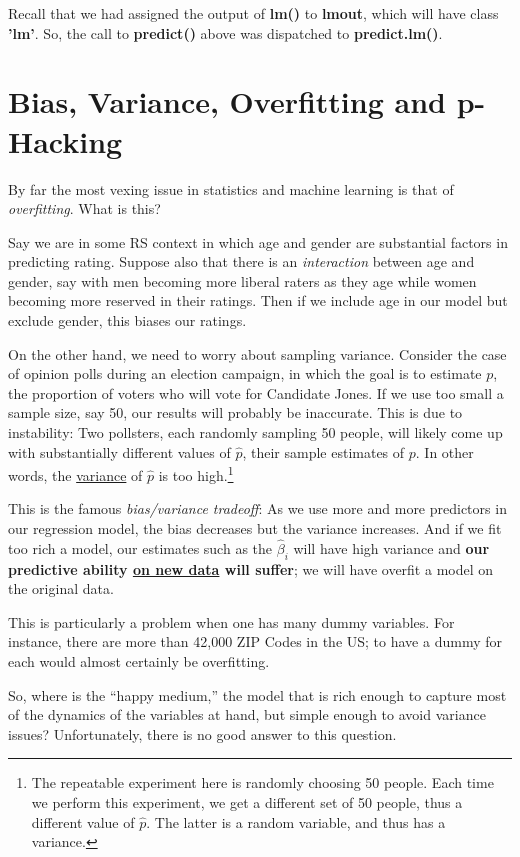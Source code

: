 Recall that we had assigned the output of \textbf{lm()} to
\textbf{lmout}, which will have class \textbf{'lm'}.  So, the call to
\textbf{predict()} above was dispatched to \textbf{predict.lm()}.

\section{Bias, Variance, Overfitting and p-Hacking}
\label{overfit}

By far the most vexing issue in statistics and machine learning is that
of \textit{overfitting}.  What is this?

Say we are in some RS context in which age and gender are substantial
factors in predicting rating.  Suppose also that there is an
\textit{interaction} between age and gender, say with men becoming more
liberal raters as they age while women becoming more reserved in their
ratings.  Then if we include age in our model but exclude gender, this
biases our ratings.

On the other hand, we need to worry about sampling variance.  Consider
the case of opinion polls during an election campaign, in which the goal
is to estimate $p$, the proportion of voters who will vote for Candidate
Jones.  If we use too small a sample size, say 50, our results will
probably be inaccurate.  This is due to instability:  Two pollsters,
each randomly sampling 50 people, will likely come up with substantially
different values of $\widehat{p}$, their sample estimates of $p$.  In
other words, the \underline{variance} of $\widehat{p}$ is too
high.\footnote{The repeatable experiment here is randomly choosing 50
people.  Each time we perform this experiment, we get a different set of
50 people, thus a different value of $\widehat{p}$.  The latter is a
random variable, and thus has a variance.}

This is the famous \textit{bias/variance tradeoff}:  As we use more and
more predictors in our regression model, the bias decreases but the
variance increases.  And if we fit too rich a model, our estimates such
as the $\widehat{\beta}_i$ will have high variance and \textbf{our
predictive ability \underline{on new data} will suffer}; we will have
overfit a model on the original data.

This is particularly a problem when one has many dummy variables. For
instance, there are more than 42,000 ZIP Codes in the US; to have a
dummy for each would almost certainly be overfitting.

So, where is the ``happy medium,'' the model that is rich enough to
capture most of the dynamics of the variables at hand, but simple enough
to avoid variance issues?  Unfortunately, there is no good answer to
this question.

